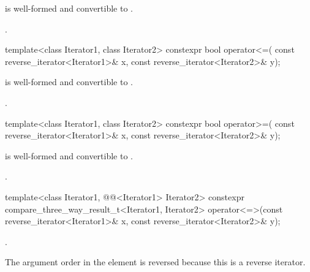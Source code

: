\begin{itemdescr}
\pnum
\constraints
{} is well-formed and
convertible to .

\pnum
\returns
{}.
\end{itemdescr}

%
\begin{itemdecl}
template<class Iterator1, class Iterator2>
  constexpr bool operator<=(
    const reverse_iterator<Iterator1>& x,
    const reverse_iterator<Iterator2>& y);
\end{itemdecl}

\begin{itemdescr}
\pnum
\constraints
{} is well-formed and
convertible to .

\pnum
\returns
{}.
\end{itemdescr}

%
\begin{itemdecl}
template<class Iterator1, class Iterator2>
  constexpr bool operator>=(
    const reverse_iterator<Iterator1>& x,
    const reverse_iterator<Iterator2>& y);
\end{itemdecl}

\begin{itemdescr}
\pnum
\constraints
{} is well-formed and
convertible to .

\pnum
\returns
{}.
\end{itemdescr}

%
\begin{itemdecl}
template<class Iterator1, @@<Iterator1> Iterator2>
  constexpr compare_three_way_result_t<Iterator1, Iterator2>
    operator<=>(const reverse_iterator<Iterator1>& x,
                const reverse_iterator<Iterator2>& y);
\end{itemdecl}

\begin{itemdescr}
\pnum
\returns
{}.

\pnum
\begin{note}
The argument order in the \returns element is reversed
because this is a reverse iterator.
\end{note}
\end{itemdescr}

